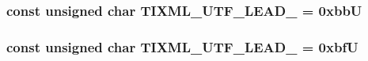 \subsubsection{\setlength{\rightskip}{0pt plus 5cm}const unsigned char {\bf TIXML\_\-UTF\_\-LEAD\_} = 0xbbU}\label{tinyxmlparser_8cpp_3cda92a178036c812663a7b75c5e04d0}


\subsubsection{\setlength{\rightskip}{0pt plus 5cm}const unsigned char {\bf TIXML\_\-UTF\_\-LEAD\_} = 0xbfU}\label{tinyxmlparser_8cpp_8e36ce25f81f009c066037e937da3a6a}


